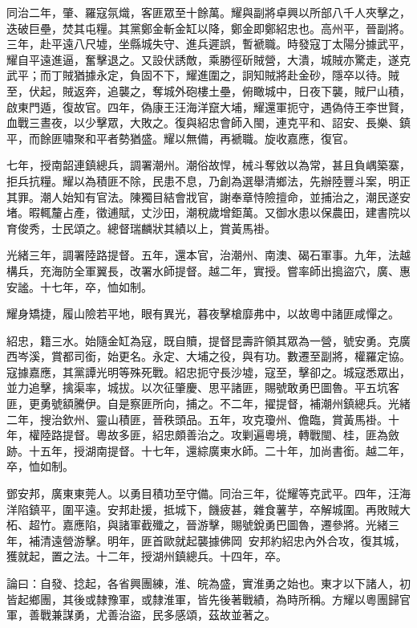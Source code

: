\begin{pinyinscope}
同治二年，肇、羅寇氛熾，客匪眾至十餘萬。耀與副將卓興以所部八千人夾擊之，迭破巨壘，焚其屯糧。其黨鄭金斬金缸以降，鄭金即鄭紹忠也。高州平，晉副將。三年，赴平遠八尺墟，坐縣城失守、進兵遲誤，暫褫職。時發寇丁太陽分據武平，耀自平遠進逼，奮擊退之。又設伏誘敵，乘勝徑斫賊營，大潰，城賊亦驚走，遂克武平；而丁賊猶據永定，負固不下，耀進圍之，詗知賊將赴金砂，隱卒以待。賊至，伏起，賊返奔，追襲之，奪城外砲樓土壘，俯瞰城中，日夜下襲，賊尸山積，啟東門遁，復故官。四年，偽康王汪海洋竄大埔，耀還軍扼守，遇偽侍王李世賢，血戰三晝夜，以少擊眾，大敗之。復與紹忠會師入閩，連克平和、詔安、長樂、鎮平，而餘匪嘯聚和平者勢猶盛。耀以無備，再褫職。旋收嘉應，復官。

七年，授南韶連鎮總兵，調署潮州。潮俗故悍，械斗奪敓以為常，甚且負嵎築寨，拒兵抗糧。耀以為積匪不除，民患不息，乃創為選舉清鄉法，先辦陸豐斗案，明正其罪。潮人始知有官法。陳獨目結會戕官，謝奉章恃險擅命，並捕治之，潮民遂安堵。暇輒釐占產，徵逋賦，丈沙田，潮稅歲增鉅萬。又御水患以保農田，建書院以育俊秀，士民頌之。總督瑞麟狀其績以上，賞黃馬褂。

光緒三年，調署陸路提督。五年，還本官，治潮州、南澳、碣石軍事。九年，法越構兵，充海防全軍翼長，改署水師提督。越二年，實授。嘗率師出搗盜穴，廣、惠安謐。十七年，卒，恤如制。

耀身矯捷，履山險若平地，眼有異光，暮夜擊槍靡弗中，以故粵中諸匪咸憚之。

紹忠，籍三水。始隨金缸為寇，既自贖，提督昆壽許領其眾為一營，號安勇。克廣西岑溪，賞都司銜，始更名。永定、大埔之役，與有功。數遷至副將，權羅定協。寇據嘉應，其黨譚光明等殊死戰。紹忠扼守長沙墟，寇至，擊卻之。城寇悉眾出，並力追擊，擒渠率，城拔。以次征肇慶、思平諸匪，賜號敢勇巴圖魯。平五坑客匪，更勇號額騰伊。自是察匪所向，捕之。不二年，擢提督，補潮州鎮總兵。光緒二年，搜治欽州、靈山積匪，晉秩頭品。五年，攻克瓊州、儋臨，賞黃馬褂。十年，權陸路提督。粵故多匪，紹忠頗善治之。攻剿遍粵境，轉戰閩、桂，匪為斂跡。十五年，授湖南提督。十七年，還綜廣東水師。二十年，加尚書銜。越二年，卒，恤如制。

鄧安邦，廣東東莞人。以勇目積功至守備。同治三年，從耀等克武平。四年，汪海洋陷鎮平，圍平遠。安邦赴援，抵城下，饑疲甚，雜食薯芋，卒解城圍。再敗賊大柘、超竹。嘉應陷，與諸軍截殲之，晉游擊，賜號銳勇巴圖魯，遷參將。光緒三年，補清遠營游擊。明年，匪首歐就起襲據佛岡，安邦約紹忠內外合攻，復其城，獲就起，置之法。十二年，授湖州鎮總兵。十四年，卒。

論曰：自發、捻起，各省興團練，淮、皖為盛，實淮勇之始也。東才以下諸人，初皆起鄉團，其後或隸豫軍，或隸淮軍，皆先後著戰績，為時所稱。方耀以粵團歸官軍，善戰兼謀勇，尤善治盜，民多感頌，茲故並著之。


\end{pinyinscope}